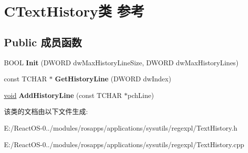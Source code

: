 \hypertarget{class_c_text_history}{}\section{C\+Text\+History类 参考}
\label{class_c_text_history}
\subsection*{Public 成员函数}
\begin{DoxyCompactItemize}
\item 
\mbox{\label{class_c_text_history_a7434cacb1db6137294d81e891b0724de}} 
B\+O\+OL {\bfseries Init} (D\+W\+O\+RD dw\+Max\+History\+Line\+Size, D\+W\+O\+RD dw\+Max\+History\+Lines)
\item 
\mbox{\label{class_c_text_history_a8ebe4f659dca56f7b5c9597f2a3358b1}} 
const T\+C\+H\+AR $\ast$ {\bfseries Get\+History\+Line} (D\+W\+O\+RD dw\+Index)
\item 
\mbox{\label{class_c_text_history_a5337d26b0f6c14ead25364703e85ea1d}} 
\hyperlink{interfacevoid}{void} {\bfseries Add\+History\+Line} (const T\+C\+H\+AR $\ast$pch\+Line)
\end{DoxyCompactItemize}


该类的文档由以下文件生成\+:\begin{DoxyCompactItemize}
\item 
E\+:/\+React\+O\+S-\/0../modules/rosapps/applications/sysutils/regexpl/Text\+History.\+h\item 
E\+:/\+React\+O\+S-\/0../modules/rosapps/applications/sysutils/regexpl/Text\+History.\+cpp\end{DoxyCompactItemize}

